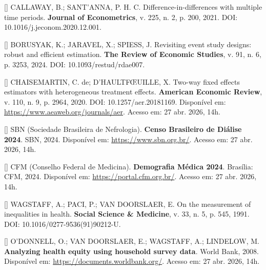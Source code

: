 \documentclass[12pt,a4paper,oneside]{article}
\begin{document}
\begin{singlespace}
\noindent\hangindent=1.25cm
[\thebibctr] CALLAWAY, B.; SANT'ANNA, P. H. C. Difference-in-differences with
multiple time periods. \textbf{Journal of Econometrics}, v. 225,
n. 2, p. 200, 2021. DOI:
10.1016/j.jeconom.2020.12.001.\label{ref:csant}\par\smallskip

\noindent\hangindent=1.25cm
[\thebibctr] BORUSYAK, K.; JARAVEL, X.; SPIESS, J. Revisiting event study
designs: robust and efficient estimation. \textbf{The Review of
Economic Studies}, v. 91, n. 6, p. 3253, 2024.
DOI: 10.1093/restud/rdae007.\label{ref:borusyak}\par\smallskip

\noindent\hangindent=1.25cm
[\thebibctr] CHAISEMARTIN, C. de; D'HAULTF{\OE}UILLE, X. Two-way fixed effects
estimators with heterogeneous treatment effects. \textbf{American
Economic Review}, v. 110, n. 9, p. 2964, 2020. DOI:
10.1257/aer.20181169. Disponível em:
\url{https://www.aeaweb.org/journals/aer}. Acesso em: 27 abr.
2026, 14h.\label{ref:chaisemartin}\par\smallskip

\noindent\hangindent=1.25cm
[\thebibctr] SBN (Sociedade Brasileira de Nefrologia). \textbf{Censo Brasileiro
de Diálise 2024}. SBN, 2024. Disponível em:
\url{https://www.sbn.org.br/}. Acesso em: 27 abr. 2026,
14h.\label{ref:sbn}\par\smallskip

\noindent\hangindent=1.25cm
[\thebibctr] CFM (Conselho Federal de Medicina). \textbf{Demografia Médica
2024}. Brasília: CFM, 2024. Disponível em:
\url{https://portal.cfm.org.br/}. Acesso em: 27 abr. 2026,
14h.\label{ref:cfm}\par\smallskip

\noindent\hangindent=1.25cm
[\thebibctr] WAGSTAFF, A.; PACI, P.; VAN DOORSLAER, E. On the measurement of
inequalities in health. \textbf{Social Science \& Medicine},
v. 33, n. 5, p. 545, 1991. DOI:
10.1016/0277-9536(91)90212-U.\label{ref:wagstaff}\par\smallskip

\noindent\hangindent=1.25cm
[\thebibctr] O'DONNELL, O.; VAN DOORSLAER, E.; WAGSTAFF, A.; LINDELOW, M.
\textbf{Analyzing health equity using household survey data}.
World Bank, 2008. Disponível em:
\url{https://documents.worldbank.org/}. Acesso em: 27 abr. 2026,
14h.\label{ref:odonnell}\par\smallskip


\end{singlespace}
\end{document}
